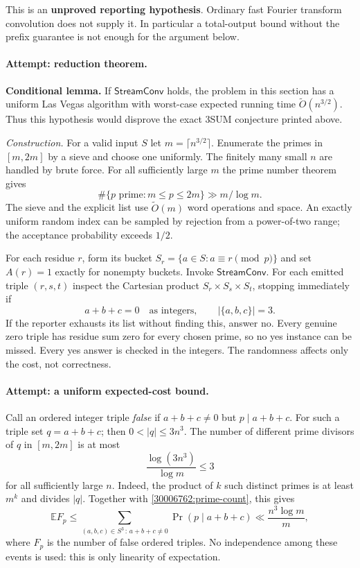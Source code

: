\documentclass[11pt,a4paper]{article}
\newcommand{\E}{\mathbb{E}}
\numberwithin{equation}{section}
\begin{document}
This is an \textbf{unproved reporting hypothesis}. Ordinary fast Fourier
transform convolution does not supply it. In particular a total-output
bound without the prefix guarantee is not enough for the argument below.

\paragraph{Attempt: reduction theorem.}
\textbf{Conditional lemma.} If $\mathsf{StreamConv}$ holds, the problem in
this section has a uniform Las Vegas algorithm with worst-case expected
running time $\widetilde O(n^{3/2})$. Thus this hypothesis would disprove
the exact 3SUM conjecture printed above.

\emph{Construction.} For a valid input $S$ let
$m=\lceil n^{3/2}\rceil$. Enumerate the primes in $[m,2m]$ by a sieve and
choose one uniformly. The finitely many small $n$ are handled by brute
force. For all sufficiently large $m$ the prime number theorem gives
\begin{equation}\label{30006762:prime-count}
 \#\{p\text{ prime}:m\le p\le2m\}\gg m/\log m.
\end{equation}
The sieve and the explicit list use $\widetilde O(m)$ word operations and
space. An exactly uniform random index can be sampled by rejection from
a power-of-two range; the acceptance probability exceeds $1/2$.

For each residue $r$, form its bucket
$S_r=\{a\in S:a\equiv r\pmod p\}$ and set
$A(r)=1$ exactly for nonempty buckets. Invoke $\mathsf{StreamConv}$.
For each emitted triple $(r,s,t)$ inspect the Cartesian product
$S_r\times S_s\times S_t$, stopping immediately if
\[
 a+b+c=0\quad\text{as integers},\qquad |\{a,b,c\}|=3.
\]
If the reporter exhausts its list without finding this, answer no.
Every genuine zero triple has residue sum zero for every chosen prime,
so no yes instance can be missed. Every yes answer is checked in the
integers. The randomness affects only the cost, not correctness.

\paragraph{Attempt: a uniform expected-cost bound.}
Call an ordered integer triple \emph{false} if $a+b+c\ne0$ but
$p\mid a+b+c$. For such a triple set $q=a+b+c$; then
$0<|q|\le3n^3$. The number of different prime divisors of $q$ in
$[m,2m]$ is at most
\begin{equation}\label{30006762:divisor-count}
 \frac{\log(3n^3)}{\log m}\le3
\end{equation}
for all sufficiently large $n$. Indeed, the product of $k$ such distinct
primes is at least $m^k$ and divides $|q|$. Together with
\eqref{30006762:prime-count}, this gives
\begin{equation}\label{30006762:false}
 \E F_p
 \le \sum_{(a,b,c)\in S^3\, :\,a+b+c\ne0}
       \Pr(p\mid a+b+c)
 \ll \frac{n^3\log m}{m},
\end{equation}
where $F_p$ is the number of false ordered triples. No independence among
these events is used: this is only linearity of expectation.
\end{document}
